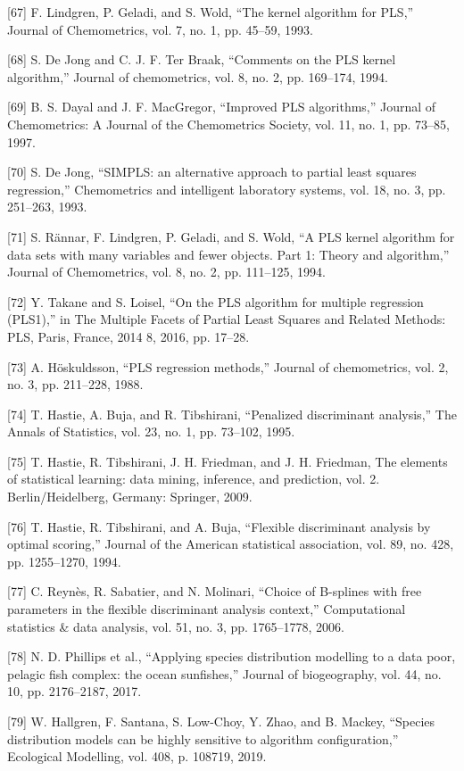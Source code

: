\documentclass[sn-mathphys-num]{sn-jnl}%
\begin{document}
[67] F. Lindgren, P. Geladi, and S. Wold, “The kernel algorithm for PLS,” Journal of Chemometrics, vol. 7, no. 1, pp. 45–59, 1993.

[68] S. De Jong and C. J. F. Ter Braak, “Comments on the PLS kernel algorithm,” Journal of chemometrics, vol. 8, no. 2, pp. 169–174, 1994.

[69] B. S. Dayal and J. F. MacGregor, “Improved PLS algorithms,” Journal of Chemometrics: A Journal of the Chemometrics Society, vol. 11, no. 1, pp. 73–85, 1997.

[70] S. De Jong, “SIMPLS: an alternative approach to partial least squares regression,” Chemometrics and intelligent laboratory systems, vol. 18, no. 3, pp. 251–263, 1993.

[71] S. Rännar, F. Lindgren, P. Geladi, and S. Wold, “A PLS kernel algorithm for data sets with many variables and fewer objects. Part 1: Theory and algorithm,” Journal of Chemometrics, vol. 8, no. 2, pp. 111–125, 1994.

[72] Y. Takane and S. Loisel, “On the PLS algorithm for multiple regression (PLS1),” in The Multiple Facets of Partial Least Squares and Related Methods: PLS, Paris, France, 2014 8, 2016, pp. 17–28.

[73] A. Höskuldsson, “PLS regression methods,” Journal of chemometrics, vol. 2, no. 3, pp. 211–228, 1988.

[74] T. Hastie, A. Buja, and R. Tibshirani, “Penalized discriminant analysis,” The Annals of Statistics, vol. 23, no. 1, pp. 73–102, 1995.

[75] T. Hastie, R. Tibshirani, J. H. Friedman, and J. H. Friedman, The elements of statistical learning: data mining, inference, and prediction, vol. 2. Berlin/Heidelberg, Germany: Springer, 2009.

[76] T. Hastie, R. Tibshirani, and A. Buja, “Flexible discriminant analysis by optimal scoring,” Journal of the American statistical association, vol. 89, no. 428, pp. 1255–1270, 1994.

[77] C. Reynès, R. Sabatier, and N. Molinari, “Choice of B-splines with free parameters in the flexible discriminant analysis context,” Computational statistics & data analysis, vol. 51, no. 3, pp. 1765–1778, 2006.

[78] N. D. Phillips et al., “Applying species distribution modelling to a data poor, pelagic fish complex: the ocean sunfishes,” Journal of biogeography, vol. 44, no. 10, pp. 2176–2187, 2017.

[79] W. Hallgren, F. Santana, S. Low-Choy, Y. Zhao, and B. Mackey, “Species distribution models can be highly sensitive to algorithm configuration,” Ecological Modelling, vol. 408, p. 108719, 2019.
\end{document}
